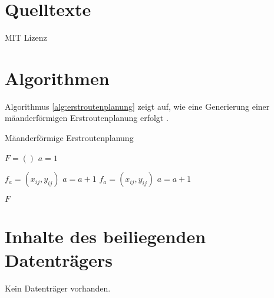 \label{chap:anhang}


\section{Quelltexte}
\label{sec:quelltexte}


\begin{code}
  
  \caption{MIT Lizenz}
  \label{lst:mitlizenz}
\end{code}


\section{Algorithmen}

Algorithmus \ref{alg:erstroutenplanung} zeigt auf, wie eine Generierung einer mäanderförmigen Erstroutenplanung erfolgt \citep[S.~42]{Bachelorthesis.2016}.

\begin{algorithm}
  \caption{Mäanderförmige Erstroutenplanung}
  \label{alg:erstroutenplanung}
  \begin{algorithmic}[1]
    \State $F=()$
    \State $a=1$

          \State $f_a = (x_{ij}, y_{ij})$
          \State $a=a+1$
        \EndFor
      \Else
          \State $f_a = (x_{ij}, y_{ij})$
          \State $a=a+1$
        \EndFor
      \EndIf
    \EndFor

    \State \Return $F$

    \EndProcedure
  \end{algorithmic}
\end{algorithm}


\section{Inhalte des beiliegenden Datenträgers}
\label{sec:quelltexte}
Kein Datenträger vorhanden.
